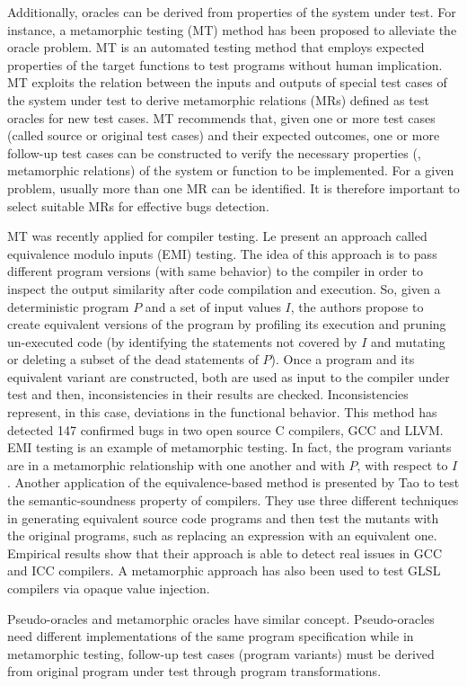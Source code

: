 \begin{itemize}
	Additionally, oracles can be derived from properties of the system under test. For instance, a metamorphic testing (MT) method has been proposed to alleviate the oracle problem\cite{chen2004case}. MT is an automated testing method that employs expected properties of the target functions to test programs without human implication. 
	MT exploits the relation between the inputs and outputs of special test cases of the system under test to derive metamorphic relations (MRs) defined as test oracles for new test cases. 
	MT recommends that, given one or more test cases (called source or original test cases) and their expected outcomes, one or more follow-up test cases can be constructed to verify the necessary properties (\ie, metamorphic relations) of the system or function to be implemented.
	For a given problem, usually more than one MR can be identified. It is therefore important to select suitable MRs for effective bugs detection.

	MT was recently applied for compiler testing. Le \etal\cite{le2014compiler} present an approach called equivalence modulo inputs (EMI) testing. The idea of this approach is to pass different program versions (with same behavior) to the compiler in order to inspect the output similarity after code compilation and execution. So, given a deterministic program $P$ and a set of input values $I$, the authors propose to create equivalent versions of the program by profiling its execution and pruning un-executed code (by identifying the statements not covered by $I$ and mutating or deleting a subset of the dead statements of $P$).
	Once a program and its equivalent variant are constructed, both are used as input to the compiler under test and then, inconsistencies in their results are checked. Inconsistencies represent, in this case, deviations in the functional behavior.
	This method has detected \num{147} confirmed bugs in two open source C compilers, GCC and LLVM.
	EMI testing is an example of metamorphic testing. In fact, the program variants are in a metamorphic relationship with one another and with $P$, with respect to $I$.
	Another application of the equivalence-based method is presented by Tao \etal\cite{tao2010automatic} to test the semantic-soundness property of compilers. They use three different techniques in generating equivalent source code programs and then test the mutants with the original programs, such as replacing an expression with an equivalent one. Empirical results show that their approach is able to detect real issues in GCC and ICC compilers.
	A metamorphic approach has also been used to test GLSL compilers via opaque value injection\cite{donaldson2016metamorphic}.
	
	Pseudo-oracles and metamorphic oracles have similar concept. Pseudo-oracles need different implementations of the same program specification while in metamorphic testing, follow-up test cases (program variants) must be derived from original program under test through program transformations.
	

	
	
\end{itemize}


